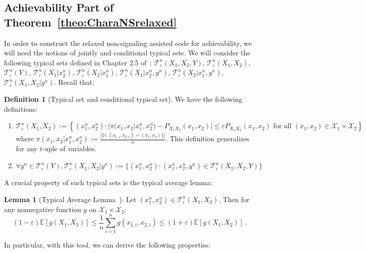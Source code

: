 \documentclass[11pt]{article}
\theoremstyle{definition}
\newtheorem{lem}[theo]{Lemma}
\newtheorem{defi}[theo]{Definition}
\theoremstyle{remark}
\begin{document}
      \subsection{Achievability Part of Theorem~\ref{theo:CharaNSrelaxed}}
      In order to construct the relaxed non-signaling assisted code for achievability, we will need the notions of jointly and conditional typical sets. We will consider the following typical sets defined in Chapter 2.5 of~\cite{GK11}: $\mathcal{T}^n_{\varepsilon}(X_1,X_2,Y)$, $\mathcal{T}^n_{\varepsilon}(X_1,X_2)$, $\mathcal{T}^n_{\varepsilon}(Y)$, $\mathcal{T}^n_{\varepsilon}(X_1|x_2^n)$, $\mathcal{T}^n_{\varepsilon}(X_2|x_1^n)$, $\mathcal{T}^n_{\varepsilon}(X_1|x_2^n,y^n)$, $\mathcal{T}^n_{\varepsilon}(X_2|x_1^n,y^n)$, $\mathcal{T}^n_{\varepsilon}(X_1,X_2|y^n)$. Recall that:
      \begin{defi}[Typical set and conditional typical set]
        We have the following definitions:
        \begin{enumerate}
        \item $\mathcal{T}^n_{\varepsilon}(X_1,X_2) := \left\{(x_1^n,x_2^n) : |\pi(x_1,x_2|x_1^n,x_2^n) - P_{X_1X_2}(x_1,x_2)|\leq \varepsilon P_{X_1X_2}(x_1,x_2) \text{ for all } (x_1,x_2) \in \mathcal{X}_1 \times \mathcal{X}_2\right\}$
      where $\pi(x_1,x_2|x_1^n,x_2^n) := \frac{|\{i : (x_{1,i},x_{2,i}) = (x_1,x_2)\}|}{n}$. This definition generalizes for any $t$-uple of variables.
    \item $\forall y^n \in \mathcal{T}^n_{\varepsilon}(Y), \mathcal{T}^n_{\varepsilon}(X_1,X_2|y^n) := \{ (x_1^n,x_2^n) : (x_1^n,x_2^n,y^n) \in \mathcal{T}^n_{\varepsilon}(X_1,X_2,Y) \}$
        \end{enumerate}
      \end{defi}

      A crucial property of such typical sets is the typical average lemma:

      \begin{lem}[Typical Average Lemma~\cite{GK11}]
        Let $(x_1^n,x_2^n) \in \mathcal{T}^n_{\varepsilon}(X_1,X_2)$. Then for any nonnegative function $g$ on $\mathcal{X}_1\times\mathcal{X}_2$:
        \[ (1-\varepsilon)\mathbb{E}[g(X_1,X_2)] \leq \frac{1}{n}\sum_{i=1}^ng(x_{1,i},x_{2,i}) \leq (1+\varepsilon)\mathbb{E}[g(X_1,X_2)] \ . \]
      \end{lem}
      
      In particular, with this tool, we can derive the following properties:
      
\end{document}
